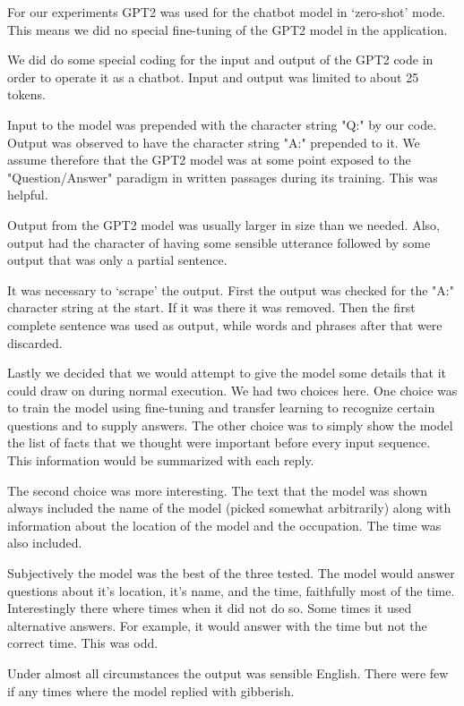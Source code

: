 For our experiments GPT2 was used for the chatbot model in `zero-shot' mode. This means we did no
special fine-tuning of the GPT2 model in the application.

We did do some special coding for the input and output of the GPT2 code in order to operate it as
a chatbot. Input and output was limited to about 25 tokens. 

Input to the model was prepended with the character string "Q:" by our code. Output was observed 
to have the character string "A:" prepended to it. We assume therefore that the GPT2 model was at some point
exposed to the "Question/Answer" paradigm in written passages during its training. This was helpful.

Output from the GPT2 model was 
usually larger in size than we needed. Also, output had the character of having some sensible utterance followed by some output that was only a partial sentence.

It was necessary to `scrape' the output. First the output was checked for the "A:" character string at the start. If it was there it was removed. Then the first complete sentence was used as output, while words and phrases after that were discarded.

Lastly we decided that we would attempt to give the model some details that it could draw on 
during normal execution. We had two choices here. One choice was to train the model using fine-tuning and transfer learning to recognize certain questions and to supply answers. The other
choice was to simply show the model the list of facts that we thought were important before 
every input sequence. This information would be summarized with each reply.

The second choice was more interesting. The text that the model was shown always included the name of 
the model (picked somewhat arbitrarily) along with information about the location of the model
and the occupation. The time was also included.

Subjectively the model was the best of the three tested. The model would answer questions about it's location, it's name, and the time, faithfully most
of the time. Interestingly there where times when it did not do so. Some times it used 
alternative answers. For example, it would answer with the time but not the correct time. This was odd.

Under almost all circumstances the output was sensible English. There were few if any times 
where the model replied with gibberish. 


